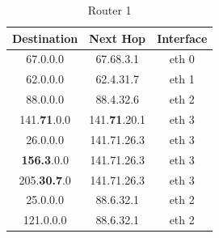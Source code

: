 \documentclass{WeSTassignment}
\begin{document}
\begin{table}[h]
\centering
\caption{Router 1}
\label{Router 1}
\begin{tabular}{ccc}
\hline
\multicolumn{1}{|c|}{\textbf{Destination}} & \multicolumn{1}{c|}{\textbf{Next Hop}} & \multicolumn{1}{c|}{\textbf{Interface}} \\ \hline
67.0.0.0                                   & 67.68.3.1                              & eth 0                                   \\
62.0.0.0                                   & 62.4.31.7                              & eth 1                                   \\
88.0.0.0                                   & 88.4.32.6                              & eth 2                                    \\
141.\textbf{71}.0.0                                  & 141.\textbf{71}.20.1                            & eth 3                                    \\
26.0.0.0                                   & 141.71.26.3                            & eth 3                                   \\
\textbf{156.3}.0.0                                  & 141.71.26.3                            & eth 3                                   \\
205.\textbf{30.7}.0                                  & 141.71.26.3                            & eth 3                                    \\
25.0.0.0                                   & 88.6.32.1                              & eth 2                                    \\
121.0.0.0                                  & 88.6.32.1                              & eth 2                                   
\end{tabular}
\end{table}
\end{document}
